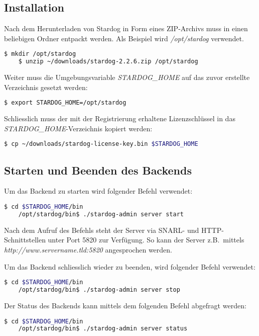 \subsection{Installation}
\label{chap:anh:ihb:backend:inst}
Nach dem Herunterladen von Stardog in Form eines ZIP-Archivs muss in einen beliebigen Ordner entpackt werden. Als Beispiel wird \textit{/opt/stardog} verwendet.
\begin{lstlisting}[language=bash]
    $ mkdir /opt/stardog
    $ unzip ~/downloads/stardog-2.2.6.zip /opt/stardog
\end{lstlisting}

Weiter muss die Umgebungsvariable \textit{STARDOG\_HOME} auf das zuvor erstellte Verzeichnis gesetzt werden:
\begin{lstlisting}[language=bash]
    $ export STARDOG_HOME=/opt/stardog
\end{lstlisting}

Schliesslich muss der mit der Registrierung erhaltene Lizenzschlüssel in das \textit{STARDOG\_HOME}-Verzeichnis kopiert werden:
\begin{lstlisting}[language=bash]
    $ cp ~/downloads/stardog-license-key.bin $STARDOG_HOME
\end{lstlisting}

\subsection{Starten und Beenden des Backends}
\label{chap:anh:ihb:backend:start}
Um das Backend zu starten wird folgender Befehl verwendet:
\begin{lstlisting}[language=bash]
                    $ cd $STARDOG_HOME/bin
    /opt/stardog/bin$ ./stardog-admin server start
\end{lstlisting}
Nach dem Aufruf des Befehls steht der Server via SNARL- und HTTP-Schnittstellen unter Port 5820 zur Verfügung. So kann der Server z.B.\ mittels \textit{http://www.servername.tld:5820} angesprochen werden.

Um das Backend schliesslich wieder zu beenden, wird folgender Befehl verwendet:
\begin{lstlisting}[language=bash]
                    $ cd $STARDOG_HOME/bin
    /opt/stardog/bin$ ./stardog-admin server stop
\end{lstlisting}

Der Status des Backends kann mittels dem folgenden Befehl abgefragt werden:
\begin{lstlisting}[language=bash]
                    $ cd $STARDOG_HOME/bin
    /opt/stardog/bin$ ./stardog-admin server status
\end{lstlisting}

